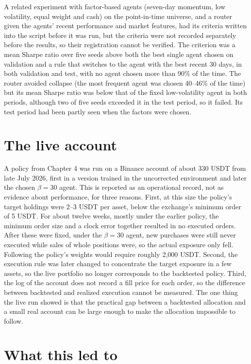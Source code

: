 \documentclass[12pt,a4paper]{report}
\begin{document}
A related experiment with factor-based agents (seven-day momentum, low
volatility, equal weight and cash) on the point-in-time universe, and a
router given the agents' recent performance and market features, had its
criteria written into the script before it was run, but the criteria
were not recorded separately before the results, so their registration
cannot be verified. The criterion was a mean Sharpe ratio over five
seeds above both the best single agent chosen on validation and a rule
that switches to the agent with the best recent 30 days, in both
validation and test, with no agent chosen more than 90\% of the time.
The router avoided collapse (the most frequent agent was chosen 40--46\%
of the time) but its mean Sharpe ratio was below that of the fixed
low-volatility agent in both periods, although two of five seeds
exceeded it in the test period, so it failed. Its test period had been
partly seen when the factors were chosen.

\section{The live account}\label{the-live-account}

A policy from Chapter 4 was run on a Binance account of about 330 USDT
from late July 2026, first in a version trained in the uncorrected
environment and later the chosen \(\beta=30\) agent. This is reported as
an operational record, not as evidence about performance, for three
reasons. First, at this size the policy's target holdings were 2--3 USDT
per asset, below the exchange's minimum order of 5 USDT. For about
twelve weeks, mostly under the earlier policy, the minimum order size
and a clock error together resulted in no executed orders. After these
were fixed, under the \(\beta=30\) agent, new purchases were still never
executed while sales of whole positions were, so the actual exposure
only fell. Following the policy's weights would require roughly 2,000
USDT. Second, the execution rule was later changed to concentrate the
target exposure in a few assets, so the live portfolio no longer
corresponds to the backtested policy. Third, the log of the account does
not record a fill price for each order, so the difference between
backtested and realized execution cannot be measured. The one thing the
live run showed is that the practical gap between a backtested
allocation and a small real account can be large enough to make the
allocation impossible to follow.

\section{What this led to}\label{what-this-led-to}
\end{document}
